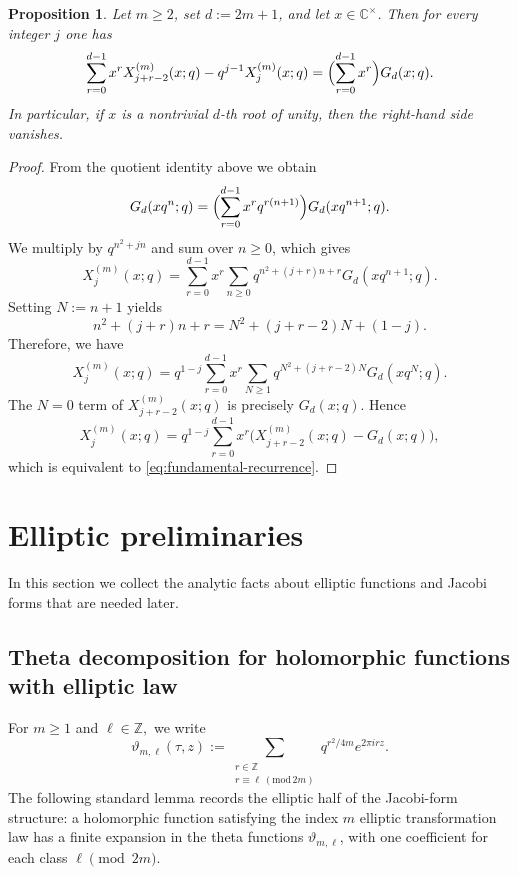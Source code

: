 \documentclass[12pt]{amsart}
\numberwithin{equation}{section}
\newtheorem{proposition}[theorem]{Proposition}
\newcommand{\CC}{\mathbb C}
\newcommand{\ZZ}{\mathbb Z}
\begin{document}
\begin{proposition}%
\label{prop:recurrence}
Let $m\geq 2$, set $d:=2m+1$, and let $x\in\CC^\times$.  Then for every integer $j$ one has
\begin{equation}\label{eq:fundamental-recurrence}
\sum_{r=0}^{d-1} x^r X_{j+r-2}^{(m)}(x;q)-q^{j-1}X_j^{(m)}(x;q)
=
\Bigl(\sum_{r=0}^{d-1}x^r\Bigr)G_d(x;q).
\end{equation}
In particular, if $x$ is a nontrivial $d$-th root of unity, then the right-hand side vanishes.
\end{proposition}

\begin{proof}
From the quotient identity above we obtain
\[
G_d(xq^n;q)=\Bigl(\sum_{r=0}^{d-1}x^rq^{r(n+1)}\Bigr)G_d(xq^{n+1};q).
\]
We multiply by $q^{n^2+jn}$ and sum over $n\geq 0$, which gives
\[
X_j^{(m)}(x;q)
=
\sum_{r=0}^{d-1}x^r\sum_{n\geq 0}q^{n^2+(j+r)n+r}G_d(xq^{n+1};q).
\]
Setting $N:=n+1$ yields
\[
n^2+(j+r)n+r=N^2+(j+r-2)N+(1-j).
\]
Therefore, we have
\[
X_j^{(m)}(x;q)
=
q^{1-j}\sum_{r=0}^{d-1}x^r\sum_{N\geq 1} q^{N^2+(j+r-2)N}G_d(xq^N;q).
\]
The $N=0$ term of $X_{j+r-2}^{(m)}(x;q)$ is precisely $G_d(x;q)$.  Hence
\[
X_j^{(m)}(x;q)
=
q^{1-j}\sum_{r=0}^{d-1}x^r\bigl(X_{j+r-2}^{(m)}(x;q)-G_d(x;q)\bigr),
\]
which is equivalent to \eqref{eq:fundamental-recurrence}.
\end{proof}

\section{Elliptic preliminaries}\label{sec:3}

In this section we collect the analytic facts about elliptic functions and Jacobi forms that are needed later.

\subsection{Theta decomposition for holomorphic functions with elliptic law}

For $m\geq 1$ and $\ell\in\ZZ,$ we write
\[
\vartheta_{m,\ell}(\tau,z)
:=
\sum_{\substack{r\in\ZZ\\ r\equiv \ell\, (\mathrm{mod}\,2m)}} q^{r^2/4m}e^{2\pi i r z}.
\]
The following standard lemma records the elliptic half of the Jacobi-form
structure: a holomorphic function satisfying the index \(m\) elliptic
transformation law has a finite expansion in the theta functions
\(\vartheta_{m,\ell}\), with one coefficient for each class
\(\ell \pmod{2m}\).
\end{document}
